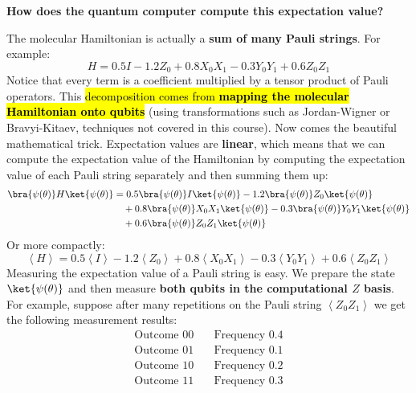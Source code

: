 \highspace
\begin{flushleft}
    \textcolor{Green3}{ \textbf{How does the quantum computer compute this expectation value?}}
\end{flushleft}
The molecular Hamiltonian is actually a \textbf{sum of many Pauli strings}. For example:
\begin{equation*}
    H = 0.5I - 1.2Z_0 + 0.8 X_0 X_1 - 0.3 Y_0 Y_1 + 0.6 Z_0 Z_1
\end{equation*}
Notice that every term is a coefficient multiplied by a tensor product of Pauli operators. This \hl{decomposition comes from \textbf{mapping the molecular Hamiltonian onto qubits}} (using transformations such as Jordan-Wigner or Bravyi-Kitaev, techniques not covered in this course).  Now comes the beautiful mathematical trick. Expectation values are \textbf{linear}, which means that we can compute the expectation value of the Hamiltonian by computing the expectation value of each Pauli string separately and then summing them up:
\begin{equation*}
    \begin{aligned}
        \bra{\psi(\theta)} H \ket{\psi(\theta)} &= 0.5 \bra{\psi(\theta)} I \ket{\psi(\theta)} - 1.2 \bra{\psi(\theta)} Z_0 \ket{\psi(\theta)} \\
        &\quad + 0.8 \bra{\psi(\theta)} X_0 X_1 \ket{\psi(\theta)} - 0.3 \bra{\psi(\theta)} Y_0 Y_1 \ket{\psi(\theta)} \\
        &\quad + 0.6 \bra{\psi(\theta)} Z_0 Z_1 \ket{\psi(\theta)}
    \end{aligned}
\end{equation*}
Or more compactly:
\begin{equation*}
    \left\langle H \right\rangle = 0.5 \left\langle I \right\rangle - 1.2 \left\langle Z_0 \right\rangle + 0.8 \left\langle X_0 X_1 \right\rangle - 0.3 \left\langle Y_0 Y_1 \right\rangle + 0.6 \left\langle Z_0 Z_1 \right\rangle
\end{equation*}
Measuring the expectation value of a Pauli string is easy. We prepare the state $\ket{\psi(\theta)}$ and then measure \textbf{both qubits in the computational $Z$ basis}. For example, suppose after many repetitions on the Pauli string $\left\langle Z_0 Z_1 \right\rangle$ we get the following measurement results:
\begin{equation*}
    \begin{aligned}
        \text{Outcome } 00 &\quad \text{Frequency } 0.4 \\
        \text{Outcome } 01 &\quad \text{Frequency } 0.1 \\
        \text{Outcome } 10 &\quad \text{Frequency } 0.2 \\
        \text{Outcome } 11 &\quad \text{Frequency } 0.3
    \end{aligned}
\end{equation*}
